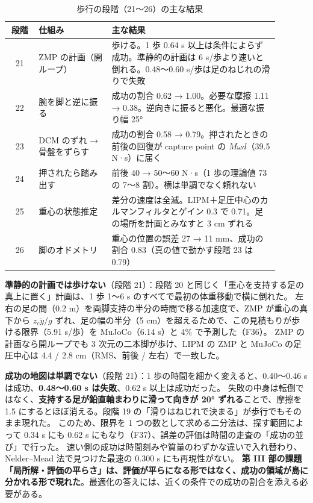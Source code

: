 \documentclass[paper=a4paper,fontsize=10pt,twocolumn,column_gap=2zw,line_length=24zw,number_of_lines=46,head_space=20mm]{jlreq}
\begin{document}
\begin{table}[t]\centering\small
\caption{歩行の段階（21〜26）の主な結果}\label{tab:walk}
\setlength{\tabcolsep}{2pt}
\begin{tabular}{@{}cp{0.27\linewidth}p{0.62\linewidth}@{}}\toprule
段階 & 仕組み & 主な結果 \\\midrule
21 & ZMP の計画（開ループ） & 歩ける。1 歩 0.64 s 以上は条件によらず成功。準静的の計画は 6 s/歩より速いと倒れる。0.48〜0.60 s/歩は足のねじれの滑りで失敗 \\
22 & 腕を脚と逆に振る & 成功の割合 0.62 → 1.00。必要な摩擦 1.11 → 0.38。逆向きに振ると悪化。最適な振り幅 25° \\
23 & DCM のずれ → 骨盤をずらす & 成功の割合 0.58 → 0.79。押されたときの前後の回復が capture point の $M\omega d$（39.5 N·s）に届く \\
24 & 押されたら踏み出す & 前後 40 → 50〜60 N·s（1 歩の理論値 73 の 7〜8 割）。横は単調でなく頼れない \\
25 & 重心の状態推定 & 差分の速度は全滅。LIPM＋足圧中心のカルマンフィルタとゲイン 0.3 で 0.71。足の場所を計画とみなすと 3 cm ずれる \\
26 & 脚のオドメトリ & 重心の位置の誤差 27 → 11 mm、成功の割合 0.83（真の値で動かす段階 23 は 0.79） \\\bottomrule
\end{tabular}
\end{table}

\textbf{準静的の計画では歩けない}（段階 21）：段階 20 と同じく「重心を支持する足の真上に置く」計画は、1 歩 1〜6 s のすべてで最初の体重移動で横に倒れた。
左右の足の間（0.2 m）を両脚支持の半分の時間で移る加速度で、ZMP が重心の真下から $z_c\ddot{y}/g$ ずれ、足の幅の半分（5 cm）を超えるためで、この見積もりが歩ける限界（5.91 s/歩）を MuJoCo（6.14 s）と 4\% で予測した（F36）。
ZMP の計画なら開ループでも 3 次元の二本脚が歩け、LIPM の ZMP と MuJoCo の足圧中心は 4.4 / 2.8 cm（RMS、前後 / 左右）で一致した。

\textbf{成功の地図は単調でない}（段階 21）：1 歩の時間を細かく変えると、0.40〜0.46 s は成功、\textbf{0.48〜0.60 s は失敗}、0.62 s 以上は成功だった。
失敗の中身は転倒ではなく、\textbf{支持する足が鉛直軸まわりに滑って向きが 20° ずれる}ことで、摩擦を 1.5 にするとほぼ消える。段階 19 の「滑りはねじれで決まる」が歩行でもそのまま現れた。
このため、限界を 1 つの数として求める二分法は、探す範囲によって 0.34 s にも 0.62 s にもなり（F37）、誤差の評価は時間の走査の「成功の並び」で行った。
速い側の成功は時間刻みや質量のわずかな違いで入れ替わり、Nelder--Mead 法で見つけた最速の 0.300 s にも再現性がない。
\textbf{第 III 部の課題「局所解・評価の平らさ」は、評価が平らになる形ではなく、成功の領域が島に分かれる形で現れた}。最適化の答えには、近くの条件での成功の割合を添える必要がある。
\end{document}
